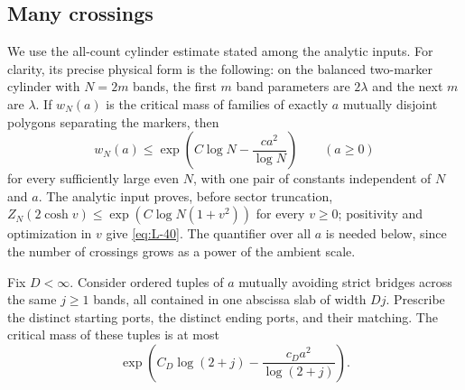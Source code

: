 \subsection{Many crossings}

We use the all-count cylinder estimate stated among the analytic
inputs. For clarity, its precise physical form is the following: on
the balanced two-marker cylinder with $N=2m$ bands, the first $m$ band
parameters are $2\lambda$ and the next $m$ are $\lambda$. If $w_N(a)$
is the critical mass of families of exactly $a$ mutually disjoint
polygons separating the markers, then
\begin{equation}
 w_N(a)\le
 \exp\!\left(C\log N-\frac{ca^2}{\log N}\right)
 \qquad(a\ge0)
 \label{eq:L-40}
\end{equation}
for every sufficiently large even $N$, with one pair of constants
independent of $N$ and $a$. The analytic input proves, before sector
truncation, $Z_N(2\cosh v)\le\exp(C\log N(1+v^2))$ for every
$v\ge0$; positivity and optimization in $v$ give
\eqref{eq:L-40}. The quantifier over all $a$ is needed below, since
the number of crossings grows as a power of the ambient scale.

\begin{lemma}\label{lem:11-many-bridges}
Fix $D<\infty$. Consider ordered tuples of $a$ mutually avoiding
strict bridges across the same $j\ge1$ bands, all contained in one
abscissa slab of width $Dj$. Prescribe the distinct starting ports,
the distinct ending ports, and their matching. The critical mass of
these tuples is at most
\begin{equation}
 \exp\!\left(C_D\log(2+j)-\frac{c_Da^2}{\log(2+j)}\right).
 \label{eq:L-41}
\end{equation}
\end{lemma}


